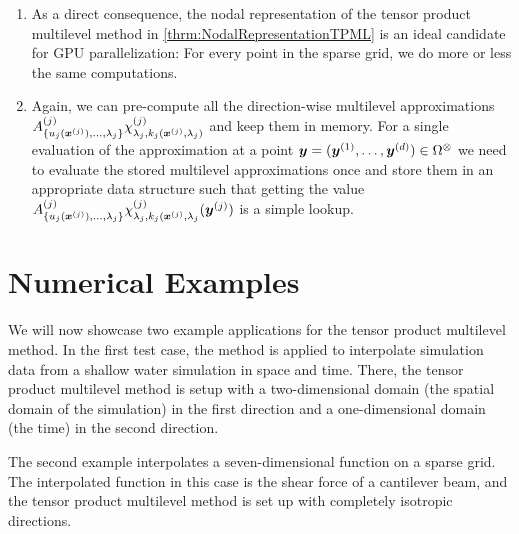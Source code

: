\documentclass[	a4paper, 
								11pt]{article}
\theoremstyle{plain}
\begin{document}
\begin{remark}
\begin{enumerate}
    \item As a direct consequence, the nodal representation of the tensor product multilevel method in \cref{thrm:NodalRepresentationTPML} is an ideal candidate for GPU parallelization: For every point in the sparse grid, we do more or less the same computations.
    \item Again, we can pre-compute all the direction-wise multilevel approximations $ A^{(j)}_{\{ u_j(\boldsymbol{x}^{(j)}), \dots, \lambda_j \}} \chi^{(j)}_{\lambda_j,k_j(\boldsymbol{x}^{(j)},\lambda_j)} $ and keep them in memory. For a single evaluation of the approximation at a point $ \boldsymbol{y} = (\boldsymbol{y}^{(1)}, \dots, \boldsymbol{y}^{(d)}) \in \Omega^{\otimes} $ we need to evaluate the stored multilevel approximations once and store them in an appropriate data structure such that getting the value $ A^{(j)}_{\{ u_j(\boldsymbol{x}^{(j)}), \dots, \lambda_j \}} \chi^{(j)}_{\lambda_j,k_j(\boldsymbol{x}^{(j)},\lambda_j} (\boldsymbol{y}^{(j)})$ is a simple lookup.
\end{enumerate}
\end{remark}


%
%
%

\section{Numerical Examples}\label{sec:NumericalExamples}

We will now showcase two example applications for the tensor product multilevel method. 
In the first test case, the method is applied to interpolate simulation data from a shallow water simulation in space and time. There, the tensor product multilevel method is setup with a two-dimensional domain (the spatial domain of the simulation) in the first direction and a one-dimensional domain (the time) in the second direction.

The second example interpolates a seven-dimensional function on a sparse grid. The interpolated function in this case is the shear force of a cantilever beam, and the tensor product multilevel method is set up with completely isotropic directions.
\end{document}
